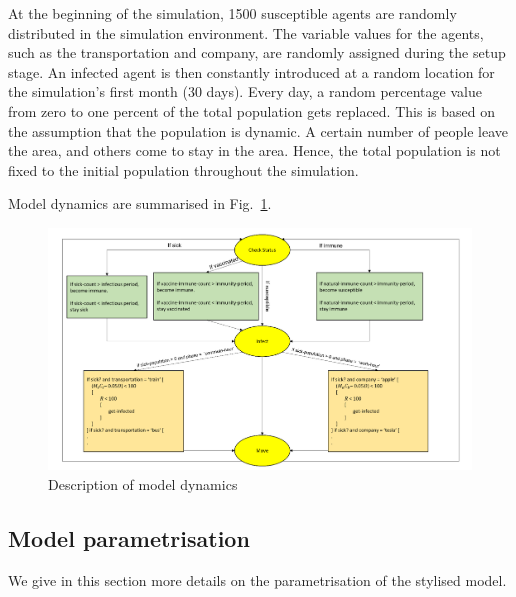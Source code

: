\documentclass[smallextended]{svjour3}       %
\begin{document}
At the beginning of the simulation, 1500 susceptible agents are randomly distributed in the simulation environment. The variable values for the agents, such as the transportation and company, are randomly assigned during the setup stage. An infected agent is then constantly introduced at a random location for the simulation's first month (30 days). Every day, a random percentage value from zero to one percent of the total population gets replaced. This is based on the assumption that the population is dynamic. A certain number of people leave the area, and others come to stay in the area. Hence, the total population is not fixed to the initial population throughout the simulation.

Model dynamics are summarised in Fig.~\ref{fig:modeldyn}.

\begin{figure}
	\centering
	\includegraphics[width=\linewidth]{figures/modelDynamics.png}
	\caption{Description of model dynamics\label{fig:modeldyn}}
\end{figure}


\subsection{Model parametrisation}

We give in this section more details on the parametrisation of the stylised model.

\end{document}
